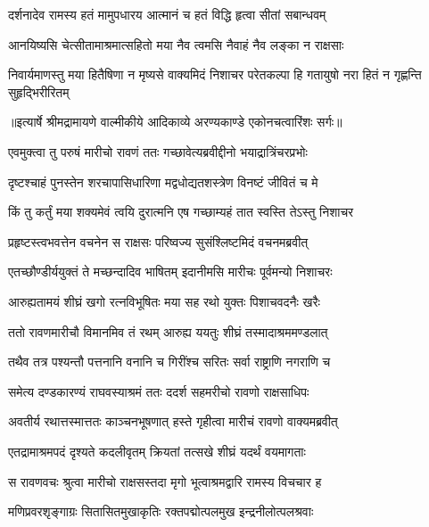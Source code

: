 \twolineshloka
{दर्शनादेव रामस्य हतं मामुपधारय}
{आत्मानं च हतं विद्धि हृत्वा सीतां सबान्धवम्} %

\twolineshloka
{आनयिष्यसि चेत्सीतामाश्रमात्सहितो मया}
{नैव त्वमसि नैवाहं नैव लङ्का न राक्षसाः} %

\fourlineindentedshloka
{निवार्यमाणस्तु मया हितैषिणा}
{ न मृष्यसे वाक्यमिदं निशाचर}
{परेतकल्पा हि गतायुषो नरा}
{ हितं न गृह्णन्ति सुहृद्भिरीरितम्} %


{॥इत्यार्षे श्रीमद्रामायणे वाल्मीकीये आदिकाव्ये अरण्यकाण्डे एकोनचत्वारिंशः सर्गः॥}


\twolineshloka
{एवमुक्त्वा तु परुषं मारीचो रावणं ततः}
{गच्छावेत्यब्रवीद्दीनो भयाद्रात्रिंचरप्रभोः} %

\twolineshloka
{दृष्टश्चाहं पुनस्तेन शरचापासिधारिणा}
{मद्वधोद्यतशस्त्रेण विनष्टं जीवितं च मे} %

\twolineshloka
{किं तु कर्तुं मया शक्यमेवं त्वयि दुरात्मनि}
{एष गच्छाम्यहं तात स्वस्ति तेऽस्तु निशाचर} %

\twolineshloka
{प्रहृष्टस्त्वभवत्तेन वचनेन स राक्षसः}
{परिष्वज्य सुसंश्लिष्टमिदं वचनमब्रवीत्} %

\twolineshloka
{एतच्छौण्डीर्ययुक्तं ते मच्छन्दादिव भाषितम्}
{इदानीमसि मारीचः पूर्वमन्यो निशाचरः} %

\twolineshloka
{आरुह्यतामयं शीघ्रं खगो रत्नविभूषितः}
{मया सह रथो युक्तः पिशाचवदनैः खरैः} %

\twolineshloka
{ततो रावणमारीचौ विमानमिव तं रथम्}
{आरुह्य ययतुः शीघ्रं तस्मादाश्रममण्डलात्} %

\twolineshloka
{तथैव तत्र पश्यन्तौ पत्तनानि वनानि च}
{गिरींश्च सरितः सर्वा राष्ट्राणि नगराणि च} %

\twolineshloka
{समेत्य दण्डकारण्यं राघवस्याश्रमं ततः}
{ददर्श सहमरीचो रावणो राक्षसाधिपः} %

\twolineshloka
{अवतीर्य रथात्तस्मात्ततः काञ्चनभूषणात्}
{हस्ते गृहीत्वा मारीचं रावणो वाक्यमब्रवीत्} %

\twolineshloka
{एतद्रामाश्रमपदं दृश्यते कदलीवृतम्}
{क्रियतां तत्सखे शीघ्रं यदर्थं वयमागताः} %

\twolineshloka
{स रावणवचः श्रुत्वा मारीचो राक्षसस्तदा}
{मृगो भूत्वाश्रमद्वारि रामस्य विचचार ह} %

\twolineshloka
{मणिप्रवरशृङ्गाग्रः सितासितमुखाकृतिः}
{रक्तपद्मोत्पलमुख इन्द्रनीलोत्पलश्रवाः} %

